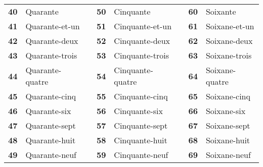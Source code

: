 \documentclass{article}
\begin{document}
\begin{center}
\begin{tabular}{r  l  c  r  l  c  r  l}
                    \textbf{40} & Quarante        &   & \textbf{50} & Cinquante        &   & \textbf{60} & Soixante\\
                    \textbf{41} & Quarante-et-un  &   & \textbf{51} & Cinquante-et-un  &   & \textbf{61} & Soixane-et-un\\
                    \textbf{42} & Quarante-deux   &   & \textbf{52} & Cinquante-deux   &   & \textbf{62} & Soixane-deux\\
                    \textbf{43} & Quarante-trois  &   & \textbf{53} & Cinquante-trois  &   & \textbf{63} & Soixane-trois\\
                    \textbf{44} & Quarante-quatre &   & \textbf{54} & Cinquante-quatre &   & \textbf{64} & Soixane-quatre\\
                    \textbf{45} & Quarante-cinq   &   & \textbf{55} & Cinquante-cinq   &   & \textbf{65} & Soixane-cinq\\
                    \textbf{46} & Quarante-six    &   & \textbf{56} & Cinquante-six    &   & \textbf{66} & Soixane-six\\
                    \textbf{47} & Quarante-sept   &   & \textbf{57} & Cinquante-sept   &   & \textbf{67} & Soixane-sept\\
                    \textbf{48} & Quarante-huit   &   & \textbf{58} & Cinquante-huit   &   & \textbf{68} & Soixane-huit\\
                    \textbf{49} & Quarante-neuf   &   & \textbf{59} & Cinquante-neuf   &   & \textbf{69} & Soixane-neuf\\[2.5ex]
                

\end{tabular}
\end{center}
\end{document}

